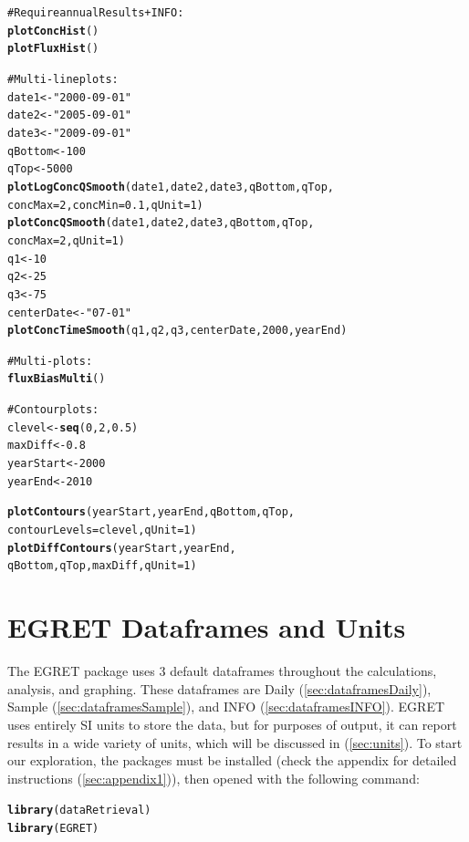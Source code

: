 \documentclass[a4paper,11pt]{article}\usepackage{graphicx, color}
\makeatletter
\newcommand{\hlfunctioncall}[1]{\textcolor[rgb]{0.501960784313725,0,0.329411764705882}{\textbf{#1}}}%
\newcommand{\hlstring}[1]{\textcolor[rgb]{0.6,0.6,1}{#1}}%
\newcommand{\hlcomment}[1]{\textcolor[rgb]{0.180392156862745,0.6,0.341176470588235}{#1}}%
\newenvironment{kframe}{%
 \def\at@end@of@kframe{}%
 \ifinner\ifhmode%
  \def\at@end@of@kframe{\end{minipage}}%
  \begin{minipage}{\columnwidth}%
 \fi\fi%
 \def\FrameCommand##1{\hskip\@totalleftmargin \hskip-\fboxsep
 \colorbox{shadecolor}{##1}\hskip-\fboxsep
     \hskip-\linewidth \hskip-\@totalleftmargin \hskip\columnwidth}%
 \MakeFramed {\advance\hsize-\width
   \@totalleftmargin\z@ \linewidth\hsize
   \@setminipage}}%
 {\par\unskip\endMakeFramed%
 \at@end@of@kframe}
\newenvironment{knitrout}{}{} %
\makeatother
\begin{document}
\begin{knitrout}
\begin{kframe}
\begin{alltt}
\hlcomment{#Require annualResults + INFO:}
\hlfunctioncall{plotConcHist}()
\hlfunctioncall{plotFluxHist}()

\hlcomment{# Multi-line plots:}
date1 <- \hlstring{"2000-09-01"}
date2 <- \hlstring{"2005-09-01"}
date3 <- \hlstring{"2009-09-01"}
qBottom<-100
qTop<-5000
\hlfunctioncall{plotLogConcQSmooth}(date1, date2, date3, qBottom, qTop, 
                   concMax=2, concMin=0.1,qUnit=1)
\hlfunctioncall{plotConcQSmooth}(date1, date2, date3, qBottom, qTop, 
                   concMax=2,qUnit=1)
q1 <- 10
q2 <- 25
q3 <- 75
centerDate <- \hlstring{"07-01"}
\hlfunctioncall{plotConcTimeSmooth}(q1, q2, q3, centerDate, 2000, yearEnd)

\hlcomment{# Multi-plots:}
\hlfunctioncall{fluxBiasMulti}()

\hlcomment{#Contour plots:}
clevel<-\hlfunctioncall{seq}(0,2,0.5)
maxDiff<-0.8
yearStart <- 2000
yearEnd <- 2010

\hlfunctioncall{plotContours}(yearStart,yearEnd,qBottom,qTop, 
             contourLevels = clevel,qUnit=1)
\hlfunctioncall{plotDiffContours}(yearStart,yearEnd,
                 qBottom,qTop,maxDiff,qUnit=1)

\end{alltt}
\end{kframe}
\end{knitrout}



\section{EGRET Dataframes and Units}
\label{sec:dataframes}
The EGRET package uses 3 default dataframes throughout the calculations, analysis, and graphing. These dataframes are Daily (\ref{sec:dataframesDaily}), Sample (\ref{sec:dataframesSample}), and INFO (\ref{sec:dataframesINFO}). EGRET uses entirely SI units to store the data, but for purposes of output, it can report results in a wide variety of units, which will be discussed in (\ref{sec:units}). To start our exploration, the packages must be installed (check the appendix for detailed instructions (\ref{sec:appendix1})), then opened with the following command:

\begin{knitrout}
\color{fgcolor}\begin{kframe}
\begin{alltt}
\hlfunctioncall{library}(dataRetrieval)
\hlfunctioncall{library}(EGRET)
\end{alltt}
\end{kframe}
\end{knitrout}
\end{document}
